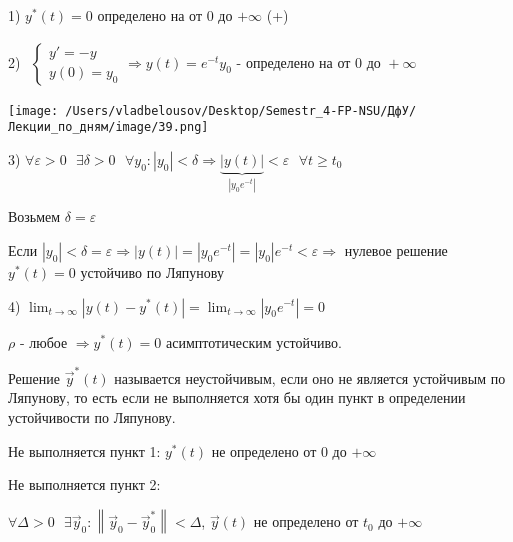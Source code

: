 \documentclass[12pt, a4paper]{report}
\begin{document}
1) \( y^{* } (t ) = 0  \) определено на от \(  0 \)  до \( + \infty  \) (+)

2) \( \begin{aligned}
    \begin{cases}
        y ' = - y \\ 
        y(0 ) = y_0
    \end{cases}
    \Rightarrow y(t ) = e^{ - t } y_0 \text{ - определено на от } 0 \text{ до  }  + \infty  
\end{aligned} \) 

\begin{center}
    \texttt{[image: /Users/vladbelousov/Desktop/Semestr\_4-FP-NSU/ДфУ/Лекции\_по\_дням/image/39.png]}
\end{center}

3) \( \forall  \varepsilon > 0 \text{ }  \exists  \delta > 0 \text{ }  \forall  y_0 : \left\lvert y_0  \right\rvert< \delta \Rightarrow \underbrace{\left\lvert y (t) \right\rvert}_{\left\lvert y_0 e^{ - t}  \right\rvert} < \varepsilon \text{ }  \forall  t \ge t_0 \) 

Возьмем \( \delta = \varepsilon  \) 

Если \( \left\lvert y_0      \right\rvert < \delta = \varepsilon \Rightarrow \left\lvert y(t ) \right\rvert = \left\lvert y_0 e^{ - t }  \right\rvert = \left\lvert y_0  \right\rvert e^{ -t } < \varepsilon  \Rightarrow \) нулевое решение \( y^* (t )   = 0\) устойчиво по Ляпунову

4) \( \displaystyle  \lim_{t  \to \infty} \left\lvert y(t) - y^* (t )  \right\rvert = \lim_{t  \to \infty}  \left\lvert y_0 e^{- t }  \right\rvert = 0\) 

\( \rho \) - любое \( \Rightarrow y^* (t ) =0\)   асимптотическим устойчиво. 

\begin{definition}
    Решение \( \vec{y } ^* (t )  \) называется неустойчивым, если оно не является устойчивым по Ляпунову, то есть если не выполняется хотя бы один пункт в определении устойчивости по Ляпунову.
\end{definition}

Не выполняется пункт 1: \( y^* (t ) \) не определено от \( 0 \) до \( + \infty  \) 

Не выполняется пункт 2: 

\( \forall  \Delta > 0 \text{ }  \exists  \vec{y } _0 : \left\lVert \vec{y}  _0 - \vec{y } ^* _0  \right\rVert < \Delta  \), \( \vec{y } (t ) \) не определено от \( t_0 \) до \( + \infty  \) 
\end{document}
